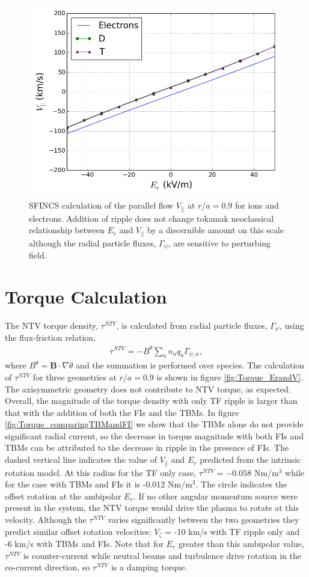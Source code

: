 \documentclass{article}
\numberwithin{figure}{section}
\numberwithin{equation}{section}
\begin{document}
\begin{figure}[h!]
\centering
\includegraphics[width=.7\textwidth]{Er_flow.png}
\caption{\label{fig:Er_flow} SFINCS calculation of the parallel flow $V_{||}$ at $r/a = 0.9$ for ions and electrons. Addition of ripple does not change tokamak neoclassical relationship between $E_r$ and $V_{||}$ by a discernible amount on this scale although the radial particle fluxes, $\Gamma_{\psi}$, are sensitive to perturbing field.}
\end{figure}

\FloatBarrier

\section{Torque Calculation}\label{torque}

The NTV torque density, $\tau^{NTV}$, is calculated from radial particle fluxes, $\Gamma_{\psi}$, using the flux-friction relation,
\begin{gather}
\tau^{NTV} = - B^{\theta} \sum_a n_a q_a \Gamma_{\psi, a},
\end{gather}
where $B^{\theta} = \bm{B} \cdot \nabla \theta$ and the summation is performed over species. The calculation of $\tau^{NTV}$ for three geometries at $r/a = 0.9$ is shown in figure \ref{fig:Torque_ErandV}. The axisymmetric geometry does not contribute to NTV torque, as expected. Overall, the magnitude of the torque density with only TF ripple is larger than that with the addition of both the FIs and the TBMs.  In figure \ref{fig:Torque_comparingTBMandFI} we show that the TBMs alone do not provide significant radial current, so the decrease in torque magnitude with both FIs and TBMs can be attributed to the decrease in ripple in the presence of FIs. The dashed vertical line indicates the value of $V_{||}$ and $E_r$ predicted from the intrinsic rotation model. At this radius for the TF only case, $\tau^{NTV} = -0.058$ Nm/m$^3$ while for the case with TBMs and FIs it is -0.012 Nm/m$^3$. The circle indicates the offset rotation at the ambipolar $E_r$. If no other angular momentum source were present in the system, the NTV torque would drive the plasma to rotate at this velocity. Although the $\tau^{NTV}$ varies significantly between the two geometries they predict similar offset rotation velocities: $V_{\zeta}$ = -10 km/s with TF ripple only and -6 km/s with TBMs and FIs. Note that for $E_r$ greater than this ambipolar value, $\tau^{NTV}$ is counter-current while neutral beams and turbulence drive rotation in the co-current direction, so $\tau^{NTV}$ is a damping torque. 
\end{document}

